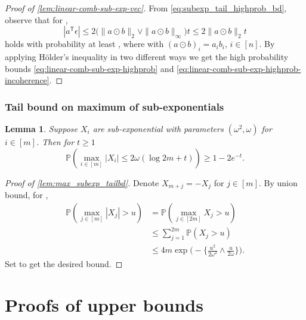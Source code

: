 \documentclass[ejs,noshowframe]{imsart}
\theoremstyle{plain}
\newtheorem{lemma}[theorem]{Lemma}
\theoremstyle{definition}
\renewcommand{\P}{\mathbb{P}}
\newcommand{\R}{\mathbb{R}}
\renewcommand{\top}{\mathsf{T}}
\begin{document}
\begin{appendix}
\begin{proof}[Proof of \autoref{lem:linear-comb-sub-exp-vec}]
From \eqref{eq:subexp_tail_highprob_bd}, observe that  for ,
\begin{equation}
|a^\top\epsilon| \leq 2 \big( \| a \odot b \|_2 \vee \| a \odot b \|_\infty 
\big) 
t \leq 2 \| a \odot b \|_2 t
\end{equation}
holds with probability at least , where \smash{$a\odot b \in 
\R^n$} with 
$(a\odot b)_i = a_i b_i$, $i\in[n]$. By applying H\"older's inequality in 
two 
different ways we get the high probability bounds 
\eqref{eq:linear-comb-sub-exp-highprob} and 
\eqref{eq:linear-comb-sub-exp-highprob-incoherence}.
\end{proof}




\subsubsection*{Tail bound on maximum of sub-exponentials}
\begin{lemma}
\label{lem:max_subexp_tailbd}
Suppose $X_i$ are sub-exponential with parameters $(\omega^2,\omega)$ for 
$i\in[m]$.
Then for $t\geq 1$
\begin{equation}
\P \left( \max_{i\in[m]} |X_i| \leq  2\omega (\log 2m + t) \right) \geq 1-2e^{-t}.
\end{equation}
\end{lemma}
\begin{proof}[Proof of \autoref{lem:max_subexp_tailbd}]
Denote $X_{m+j} = -X_j$ for $j\in[m]$. 
By union bound, for ,
\begin{align}
\P\left(\max_{j\in[m]} |X_j| > u\right) 
&= \P\left(\max_{j\in[2m]} X_j > u\right)\\
& \leq \sum_{j=1}^{2m} \P(X_j > u)\\
&\leq 4m \exp\Big( -\Big\{ \frac{u^2}{2\omega^2} \wedge 
\frac{u}{2\omega}\Big\}\Big).
\end{align}
Set  to get the desired bound.
\end{proof}










\section{Proofs of upper bounds}
\label{sec:app-error-bounds}


\end{appendix}
\end{document}
